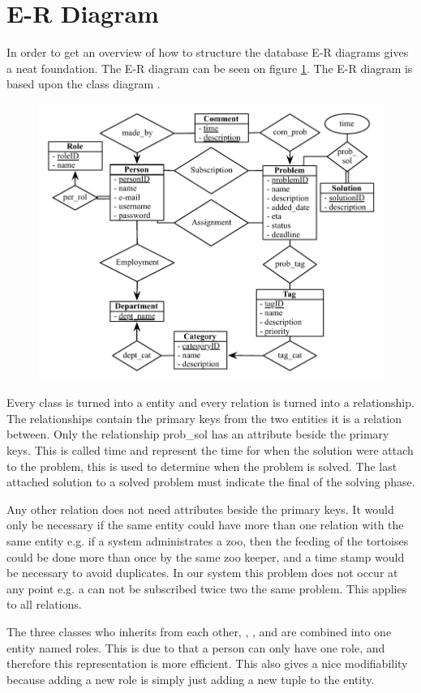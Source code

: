 \newcommand{\erdiagram}[1][]{E-R diagram}
\section{E-R Diagram}
In order to get an overview of how to structure the database \erdiagram[]s gives a neat foundation. The \erdiagram[] can be seen on figure \ref{fig:er_diagram}.
The \erdiagram[] is based upon the class diagram . 

\begin{figure}[h]
	\centering
		\includegraphics[scale=0.8]{input/implementation/database/ER-diagram.pdf}
	\label{fig:er_diagram}
\end{figure}

Every class is turned into a entity and every relation is turned into a relationship. The relationships contain the primary keys from the two entities it is a relation between. Only the relationship prob\_sol has an attribute beside the primary keys. This is called time and represent the time for when the solution were attach to the problem, this is used to determine when the problem is solved. The last attached solution to a solved problem must indicate the final of the solving phase. 

Any other relation does not need attributes beside the primary keys. It would only be necessary if the same entity could have more than one relation with the same entity e.g. if a system administrates a zoo, then the feeding of the tortoises could be done more than once by the same zoo keeper, and a time stamp would be necessary to avoid duplicates. In our system this problem does not occur at any point e.g. a \client[] can not be subscribed twice two the same problem. This applies to all relations. 

The three classes who inherits from each other, \client[], \staff[], and \admin[] are combined into one entity named roles. This is due to that a person can only have one role, and therefore this representation is more efficient. This also gives a nice modifiability because adding a new role is simply just adding a new tuple to the entity. 
